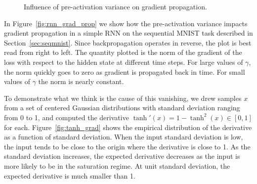 \documentclass{article} %
\begin{document}
\begin{figure}[!ht]
  \center%
  \hspace{2mm}%
  \caption{
Influence of pre-activation variance on gradient propagation.
}
  \label{fig:variance}
\end{figure}

In Figure~\ref{fig:rnn_grad_prop} we show how the pre-activation variance impacts gradient propagation in a simple RNN on the sequential MNIST task described in Section~\ref{sec:seqmnist}.
Since backpropagation operates in reverse, the plot is best read from right to left.
The quantity plotted is the norm of the gradient of the loss with respect to the hidden state at different time steps.
For large values of $\gamma$, the norm quickly goes to zero as gradient is propagated back in time.
For small values of $\gamma$ the norm is nearly constant.

To demonstrate what we think is the cause of this vanishing, we drew samples $x$ from a set of centered Gaussian distributions with standard deviation ranging from 0 to 1, and computed the derivative $\tanh'(x) = 1 - \tanh^2(x) \in [0, 1]$ for each.
Figure~\ref{fig:tanh_grad} shows the empirical distribution of the derivative as a function of standard deviation.
When the input standard deviation is low, the input tends to be close to the origin where the derivative is close to 1.
As the standard deviation increases, the expected derivative decreases as the input is more likely to be in the saturation regime.
At unit standard deviation, the expected derivative is much smaller than 1.
\end{document}
